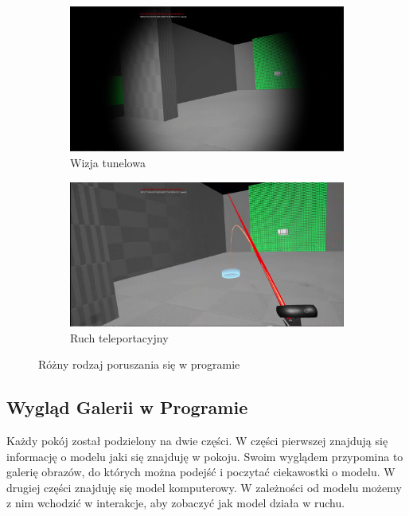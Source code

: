 \documentclass[a4paper,12pt,reqno]{article}
\begin{document}
\begin{figure}[!ht]%
	\centering
	\begin{subfigure}{.5\textwidth}
		\centering
		\includegraphics[width=1\linewidth]{graphics/tunnelvisionUE4.png}
		\caption{Wizja tunelowa}	
		\label{ref:subref_a}
	\end{subfigure}%
	\begin{subfigure}{.5\textwidth}
		\centering
		\includegraphics[width=1\linewidth]{graphics/teleportmoveUE4.png}
		\caption{Ruch teleportacyjny}
		\label{ref:subref_b}
	\end{subfigure}%

\caption{Różny rodzaj poruszania się w programie}
\label{ref:ref}
\end{figure}

\newpage
\subsection{Wygląd Galerii w Programie}

Każdy pokój został podzielony na dwie części. W części pierwszej znajdują się informację o modelu jaki się znajduję w pokoju. Swoim wyglądem przypomina to galerię obrazów, do których można podejść i poczytać ciekawostki o modelu. W drugiej części znajduję się model komputerowy. W zależności od modelu możemy z nim wchodzić w interakcje, aby zobaczyć jak model działa w ruchu.
\end{document}
